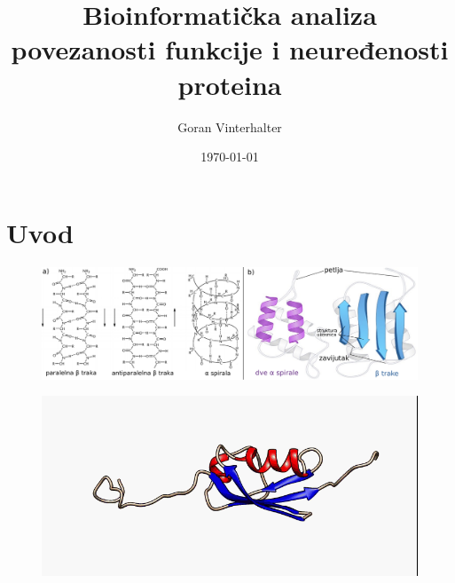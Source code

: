 \documentclass{beamer}
\title[Povezanost funkcije i neuređenosti proteina]{Bioinformatička analiza povezanosti funkcije i neuređenosti proteina}
\author{Goran Vinterhalter}
\institute[Matematički fakultet]{ Matematički fakultet, Beogradski univerzitet }
\date{\today}
\begin{document}


\begin{frame}
  \titlepage
\end{frame}


\section{Uvod}

\begin{frame} 
  \begin{figure}
    \hspace*{-0.2cm}
    \includegraphics[scale=0.35]{uvod/sekundarna.pdf}
  \end{figure}
  \begin{figure}
    \centering
    \includegraphics[scale=0.30]{sumo/sumo1-0.png}
  \end{figure}
\end{frame}
\end{document}
